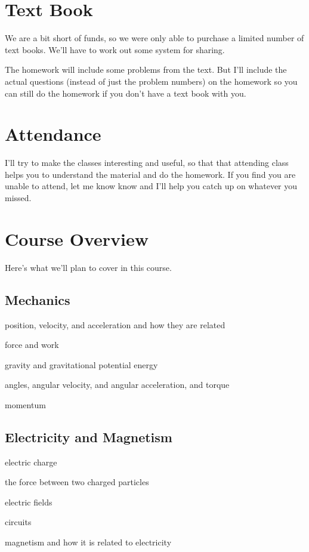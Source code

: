 \documentclass{article}
\begin{document}
\section{Text Book}
We are a bit short of funds, so we were only able to purchase a limited number of text books.  We'll have to work out
some system for sharing.  

The homework will include some problems from the text.  But I'll include the actual questions (instead of just the
problem numbers) on the homework so you can still do the homework if you don't have a text book with you.

\section{Attendance}
I'll try to make the classes interesting and useful, so that that attending class helps you to understand the material
and do the homework.  If you find you are unable to attend, let me know know and I'll help you catch up on whatever
you missed.


\section{Course Overview}

Here's what we'll plan to cover in this course.

\subsection{Mechanics}

\begin{itemize*}
  \item position, velocity, and acceleration and how they are related
  \item force and work
  \item gravity and gravitational potential energy
  \item angles, angular velocity, and angular acceleration, and torque
  \item momentum
\end{itemize*}

\subsection{Electricity and Magnetism}
\begin{itemize*}
  \item electric charge
  \item the force between two charged particles
  \item electric fields
  \item circuits
  \item magnetism and how it is related to electricity
\end{itemize*}
\end{document}
